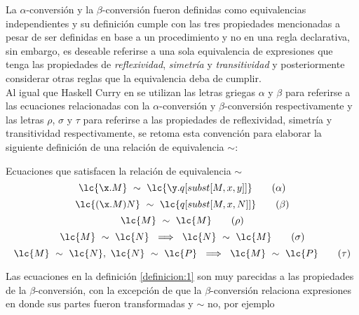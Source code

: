 La \(\alpha\)-conversión y la \(\beta\)-conversión fueron definidas como
equivalencias independientes y su definición cumple con las tres propiedades
mencionadas a pesar de ser definidas en base a un procedimiento y no en una
regla declarativa, sin embargo, es deseable referirse a una sola equivalencia de
expresiones que tenga las propiedades de \emph{reflexividad}, \emph{simetría} y
\emph{transitividad} y posteriormente considerar otras reglas que la equivalencia
deba de cumplir. \\

Al igual que Haskell Curry en \cite[p.~59]{Curry:CombinatoryLogicI} se utilizan
las letras griegas \(\alpha\) y \(\beta\) para referirse a las ecuaciones
relacionadas con la \(\alpha\)-conversión y \(\beta\)-conversión respectivamente
y las letras \(\rho\), \(\sigma\) y \(\tau\) para referirse a las propiedades de
reflexividad, simetría y transitividad respectivamente, se retoma esta
convención para elaborar la siguiente definición de una relación de equivalencia
\(\sim\): \\

\begin{defi} Ecuaciones que satisfacen la relación de equivalencia \(\sim\)
  \label{definicion:1}
  \begin{equation} \label{definicion:1:alpha}
    \lc{\x.M}\ \sim\ \lc{\y.q[subst[M,x,y]]} \tag{\ensuremath{\alpha}}
  \end{equation}
  \begin{equation} \label{definicion:1:beta}
    \lc{(\x.M)N}\ \sim\ \lc{q[subst[M,x,N]]} \tag{\ensuremath{\beta}}
  \end{equation}
  \begin{equation} \label{definicion:1:rho}
    \lc{M}\ \sim\ \lc{M} \tag{\ensuremath{\rho}}
  \end{equation}
  \begin{equation} \label{definicion:1:sigma}
    \lc{M}\ \sim\ \lc{N}\ \implies\ \lc{N}\ \sim\ \lc{M} \tag{\ensuremath{\sigma}}
  \end{equation}
  \begin{equation} \label{definicion:1:tau}
    \lc{M}\ \sim\ \lc{N},\ \lc{N}\ \sim\ \lc{P}\ \implies\ \lc{M}\ \sim\ \lc{P} \tag{\ensuremath{\tau}}
  \end{equation}
\end{defi}

Las ecuaciones en la definición \ref{definicion:1} son muy parecidas a las
propiedades de la \(\beta\)-conversión, con la excepción de que la
\(\beta\)-conversión relaciona expresiones en donde sus partes fueron
transformadas y \(\sim\) no, por ejemplo


